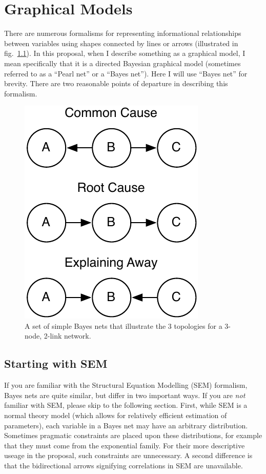 \graphicspath{{graphical-models/}}

\chapter{Graphical Models}

There are numerous formalisms for representing informational relationships
between variables using shapes connected by lines or arrows (illustrated in
fig.~\ref{fig:bayes}). In this proposal, when I describe something as a
graphical model, I mean specifically that it is a directed Bayesian graphical
model (sometimes referred to as a ``Pearl net'' or a ``Bayes net''). Here I will use
``Bayes net'' for brevity.  There are two reasonable points of departure in
describing this formalism.

\begin{figure}
\begin{center}
\includegraphics{bayes-nets.pdf}
\end{center}
\caption{A set of simple Bayes nets that illustrate the 3 topologies for a
    3-node, 2-link network.}
\label{fig:bayes}
\end{figure}

\section{Starting with SEM}

If you are familiar with the Structural Equation Modelling (SEM) formalism,
Bayes nets are quite similar, but differ in two
important ways. If you are \emph{not} familiar with SEM, please skip to the
following section. First, while SEM is a normal theory model (which allows for
relatively efficient estimation of parameters), each variable in a Bayes net may
have an arbitrary distribution. Sometimes pragmatic constraints are
placed upon these distributions, for example that they must come from the
exponential family. For their more descriptive useage in the proposal, such
constraints are unnecessary. A second difference is that the bidirectional arrows
signifying correlations in SEM are unavailable.


